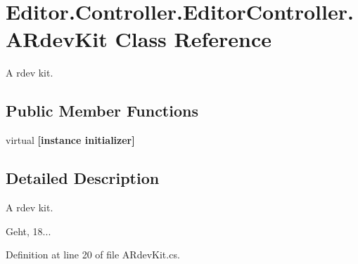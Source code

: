 \section{Editor.\-Controller.\-Editor\-Controller.\-A\-Rdev\-Kit Class Reference}
\label{class_editor_1_1_controller_1_1_editor_controller_1_1_a_rdev_kit}


A rdev kit.  


\subsection*{Public Member Functions}
\begin{DoxyCompactItemize}
\item 
virtual {\bfseries [instance initializer]}\label{class_editor_1_1_controller_1_1_editor_controller_1_1_a_rdev_kit_a3ad44a8204598cfdb4d3cd3b74b2664b}

\end{DoxyCompactItemize}


\subsection{Detailed Description}
A rdev kit. 

Geht, 18... 

Definition at line 20 of file A\-Rdev\-Kit.\-cs.

